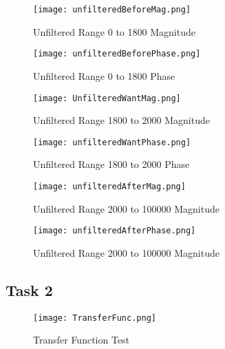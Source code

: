 \documentclass[12pt]{report}
\begin{document}
\begin{figure}[H]
\begin{center}
\caption{Unfiltered Range 0 to 1800 Magnitude}
\texttt{[image: unfilteredBeforeMag.png]}
\end{center}
\end{figure}

\begin{figure}[H]
\begin{center}
\caption{Unfiltered Range 0 to 1800 Phase}
\texttt{[image: unfilteredBeforePhase.png]}
\end{center}
\end{figure}

\begin{figure}[H]
\begin{center}
\caption{Unfiltered Range 1800 to 2000 Magnitude}
\texttt{[image: UnfilteredWantMag.png]}
\end{center}
\end{figure}

\begin{figure}[H]
\begin{center}
\caption{Unfiltered Range 1800 to 2000 Phase}
\texttt{[image: unfilteredWantPhase.png]}
\end{center}
\end{figure}

\begin{figure}[H]
\begin{center}
\caption{Unfiltered Range 2000 to 100000 Magnitude}
\texttt{[image: unfilteredAfterMag.png]}
\end{center}
\end{figure}

\begin{figure}[H]
\begin{center}
\caption{Unfiltered Range 2000 to 100000 Magnitude}
\texttt{[image: unfilteredAfterPhase.png]}
\end{center}
\end{figure}

\subsection{Task 2}
\begin{figure}[H]
\begin{center}
\caption{Transfer Function Test}
\texttt{[image: TransferFunc.png]}
\end{center}
\end{figure}
\end{document}
